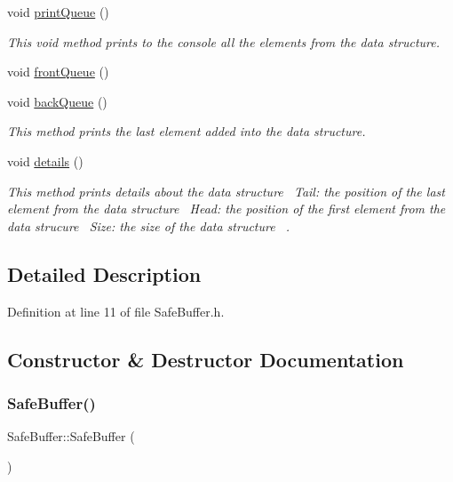 \begin{DoxyCompactItemize}
void \hyperlink{classSafeBuffer_a6dec42b442f7cca40ee43fc54e8f035c}{print\+Queue} ()
\begin{DoxyCompactList}\small\item\em This void method prints to the console all the elements from the data structure. \end{DoxyCompactList}\item 
void \hyperlink{classSafeBuffer_a86fe7b908e03bad1b234d4bb4d0919c3}{front\+Queue} ()
\item 
void \hyperlink{classSafeBuffer_af64bc15803fd26fa02cc40357c635a33}{back\+Queue} ()
\begin{DoxyCompactList}\small\item\em This method prints the last element added into the data structure. \end{DoxyCompactList}\item 
void \hyperlink{classSafeBuffer_affaee5f2062b85d8a95379b7e66e1549}{details} ()
\begin{DoxyCompactList}\small\item\em This method prints details about the data structure~\newline
 Tail\+: the position of the last element from the data structure~\newline
 Head\+: the position of the first element from the data strucure~\newline
 Size\+: the size of the data structure~\newline
. \end{DoxyCompactList}\end{DoxyCompactItemize}


\subsection{Detailed Description}


Definition at line 11 of file Safe\+Buffer.\+h.



\subsection{Constructor \& Destructor Documentation}
\mbox{\label{classSafeBuffer_af835d8d08c4dcd3326f21ae2e9988699}} 
\subsubsection{\texorpdfstring{Safe\+Buffer()}{SafeBuffer()}}
{\footnotesize\ttfamily Safe\+Buffer\+::\+Safe\+Buffer (\begin{DoxyParamCaption}{ }\end{DoxyParamCaption})\hspace{0.3cm}{\ttfamily [inline]}}



